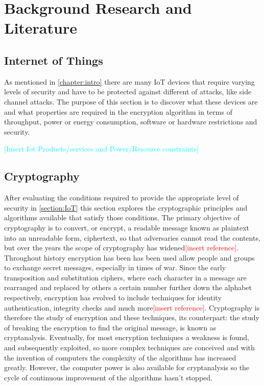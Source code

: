 \documentclass[12pt,twoside,a4paper]{report}
\begin{document}
    \chapter{Background Research and Literature}
    \label{chapter:research}
    
    \section{Internet of Things}
    \label{section:IoT}
    As mentioned in \autoref{chapter:intro} there are many IoT devices that require varying levels of security and have to be protected against different of attacks, like side channel attacks. The purpose of this section is to discover what these devices are and what properties are required in the encryption algorithm in terms of throughput, power or energy consumption, software or hardware restrictions and security.
    
    \textcolor{cyan}{[Insert Iot Products/services and Power/Resource constraints]}
    
    \section{Cryptography}
    After evaluating the conditions required to provide the appropriate level of security  in \autoref{section:IoT} this section explores the cryptographic principles and algorithms available that satisfy those conditions. The primary objective of cryptography is to convert, or encrypt, a readable message known as plaintext into an unreadable form, ciphertext, so that adversaries cannot read the contents,  but over the years the scope of cryptography has widened\textcolor{red}{[insert reference]}. Throughout history encryption has been has been used allow people and groups to exchange secret messages, especially in times of war. Since the early transposition and substitution ciphers, where each character in a message are rearranged and replaced by others a certain number further down the alphabet respectively, encryption has evolved to include techniques for identity authentication, integrity checks and much more\textcolor{red}{[insert reference]}. Cryptography is therefore the study of encryption and these techniques, its counterpart: the study of breaking the encryption to find the original message, is known as cryptanalysis. Eventually, for most encryption techniques a weakness is found, and subsequently exploited, so more complex techniques are conceived and with the invention of computers the complexity of the algorithms has increased greatly. However, the computer power is also available for cryptanalysis so the cycle of continuous improvement of the algorithms hasn't stopped.
    
\end{document}
